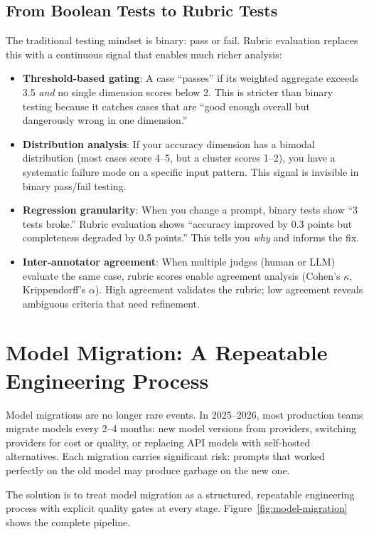 \subsection{From Boolean Tests to Rubric Tests}

The traditional testing mindset is binary: pass or fail. Rubric evaluation replaces this with a continuous signal that enables much richer analysis:

\begin{itemize}[leftmargin=*]
    \item \textbf{Threshold-based gating}: A case ``passes'' if its weighted aggregate exceeds 3.5 \emph{and} no single dimension scores below 2. This is stricter than binary testing because it catches cases that are ``good enough overall but dangerously wrong in one dimension.''
    \item \textbf{Distribution analysis}: If your accuracy dimension has a bimodal distribution (most cases score 4--5, but a cluster scores 1--2), you have a systematic failure mode on a specific input pattern. This signal is invisible in binary pass/fail testing.
    \item \textbf{Regression granularity}: When you change a prompt, binary tests show ``3 tests broke.'' Rubric evaluation shows ``accuracy improved by 0.3 points but completeness degraded by 0.5 points.'' This tells you \emph{why} and informs the fix.
    \item \textbf{Inter-annotator agreement}: When multiple judges (human or LLM) evaluate the same case, rubric scores enable agreement analysis (Cohen's $\kappa$, Krippendorff's $\alpha$). High agreement validates the rubric; low agreement reveals ambiguous criteria that need refinement.
\end{itemize}


\section{Model Migration: A Repeatable Engineering Process}
\label{sec:model-migration}

Model migrations are no longer rare events. In 2025--2026, most production teams migrate models every 2--4 months: new model versions from providers, switching providers for cost or quality, or replacing API models with self-hosted alternatives. Each migration carries significant risk: prompts that worked perfectly on the old model may produce garbage on the new one.

The solution is to treat model migration as a structured, repeatable engineering process with explicit quality gates at every stage. Figure~\ref{fig:model-migration} shows the complete pipeline.

